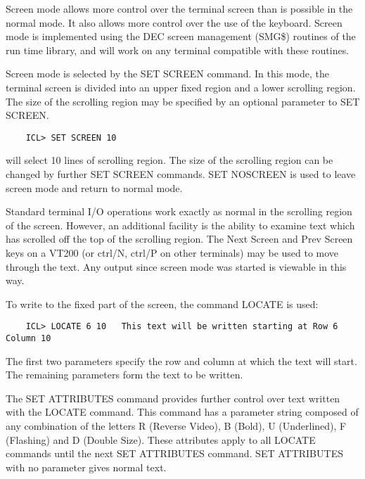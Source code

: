 Screen mode allows more control over the terminal screen than is possible
in the normal mode.
It also allows more control over the use of the keyboard.
Screen mode is implemented using the DEC screen management (SMG\$) routines
of the run time library, and will work on any terminal compatible with these
routines.

Screen mode is selected by the SET SCREEN command.
In this mode, the terminal screen is divided into an upper fixed region and a
lower scrolling region.
The size of the scrolling region may be specified by an optional parameter
to SET SCREEN.

\begin{small}
\begin{verbatim}
    ICL> SET SCREEN 10
\end{verbatim}
\end{small}

will select 10 lines of scrolling region.
The size of the scrolling region can be changed by further SET SCREEN commands.
SET NOSCREEN is used to leave screen mode and return to normal mode.

Standard terminal I/O operations work exactly as normal in the scrolling
region of the screen.
However, an additional facility is the ability to examine text which has
scrolled off the top of the scrolling region.
The Next Screen and Prev Screen keys on a VT200 (or ctrl/N, ctrl/P on other
terminals) may be used to move through the text.
Any output since screen mode was started is viewable in this way.

To write to the fixed part of the screen, the command LOCATE is used:

\begin{small}
\begin{verbatim}
    ICL> LOCATE 6 10   This text will be written starting at Row 6 Column 10
\end{verbatim}
\end{small}

The first two parameters specify the row and column at which the text will
start.
The remaining parameters form the text to be written.

The SET ATTRIBUTES command provides further control over text written with
the LOCATE command.
This command has a parameter string composed of any combination of the letters
R (Reverse Video), B (Bold), U (Underlined), F (Flashing) and D (Double Size).
These attributes apply to all LOCATE commands until the next SET ATTRIBUTES
command.
SET ATTRIBUTES with no parameter gives normal text.

